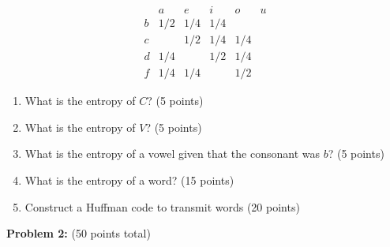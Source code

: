 \documentclass[11pt,a4paper,twoside]{article}
\begin{document}
\[
\begin{array}{c|c|c|c|c|c}  & a & e & i& o &u\\\hline b & 1/2 &1/4 &1/4 & &\\\hline c &  &1/2 &1/4 &1/4 &\\\hline d &1/4  & &1/2 &1/4 &\\\hline f &1/4  &1/4 & &1/2 &\end{array}
\]
\begin{enumerate}
\item What is the entropy of $C$? (5 points) %

\noindent{}

\item What is the entropy of $V$? (5 points) 

\noindent{}

\item What is the entropy of a vowel given that the consonant was $b$? (5 points) 

\noindent{}

\item What is the entropy of a word? (15 points) 

\noindent{}

\item Construct a Huffman code to transmit words (20 points)

\noindent{}

\end{enumerate}
\newpage
\noindent \textbf{Problem 2:} \emph{} (50 points total)\\
\end{document}
